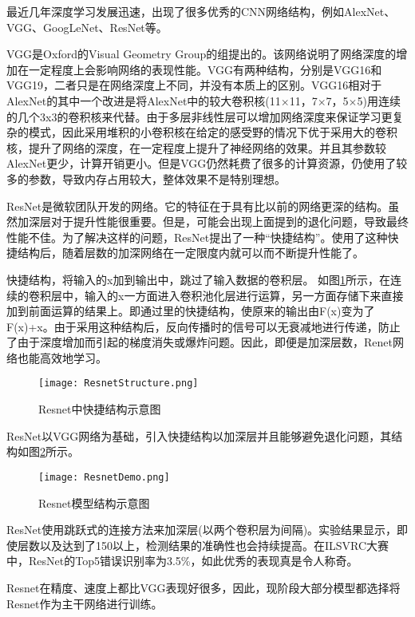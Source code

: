 最近几年深度学习发展迅速，出现了很多优秀的CNN网络结构，例如AlexNet、VGG、GoogLeNet、ResNet等。

VGG\cite{VGG}是Oxford的Visual Geometry Group的组提出的。该网络说明了网络深度的增加在一定程度上会影响网络的表现性能。VGG\cite{VGG}有两种结构，分别是VGG16和VGG19，二者只是在网络深度上不同，并没有本质上的区别。VGG16相对于AlexNet\cite{AlexNet}的其中一个改进是将AlexNet中的较大卷积核(11$\times$11，7$\times$7，5$\times$5)用连续的几个3x3的卷积核来代替。由于多层非线性层可以增加网络深度来保证学习更复杂的模式，因此采用堆积的小卷积核在给定的感受野的情况下优于采用大的卷积核，提升了网络的深度，在一定程度上提升了神经网络的效果。并且其参数较AlexNet更少，计算开销更小。但是VGG仍然耗费了很多的计算资源，仍使用了较多的参数，导致内存占用较大，整体效果不是特别理想。

ResNet\cite{Resnet}是微软团队开发的网络。它的特征在于具有比以前的网络更深的结构。虽然加深层对于提升性能很重要。但是，可能会出现上面提到的退化问题，导致最终性能不佳。为了解决这样的问题，ResNet提出了一种“快捷结构”。使用了这种快捷结构后，随着层数的加深网络在一定限度内就可以而不断提升性能了。

快捷结构，将输入的x加到输出中，跳过了输入数据的卷积层。
如图\ref{ResnetStructure}所示，在连续的卷积层中，输入的x一方面进入卷积池化层进行运算，另一方面存储下来直接加到前面运算的结果上。即通过里的快捷结构，使原来的输出由F(x)变为了F(x)+x。由于采用这种结构后，反向传播时的信号可以无衰减地进行传递，防止了由于深度增加而引起的梯度消失或爆炸问题。因此，即便是加深层数，Renet网络也能高效地学习。

\begin{figure}
	\center
	{\texttt{[image: ResnetStructure.png]}}
	\caption{Resnet中快捷结构示意图}
	\label{ResnetStructure}
\end{figure}

ResNet以VGG网络为基础，引入快捷结构以加深层并且能够避免退化问题，其结构如图\ref{ResnetDemo}所示。

\begin{figure}
	{\texttt{[image: ResnetDemo.png]}}
	\caption{Resnet模型结构示意图}
	\label{ResnetDemo}
\end{figure}

ResNet使用跳跃式的连接方法来加深层(以两个卷积层为间隔)。实验结果显示，即使层数以及达到了150以上，检测结果的准确性也会持续提高。在ILSVRC大赛中，ResNet的Top5错误识别率为3.5\%，如此优秀的表现真是令人称奇。

Resnet在精度、速度上都比VGG表现好很多，因此，现阶段大部分模型都选择将Resnet作为主干网络进行训练。

